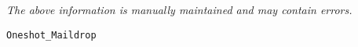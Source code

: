 \label{pkg:oneshot\_maildrop}

{\tiny \it The above information is manually maintained and may contain errors.}
\begin{verbatim}
Oneshot_Maildrop
\end{verbatim}
